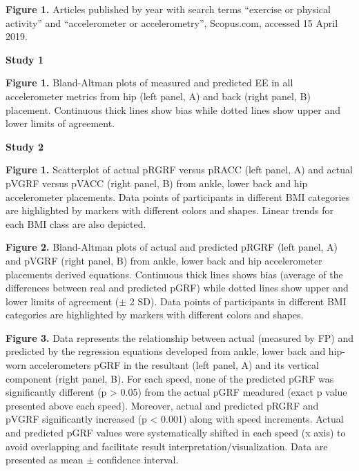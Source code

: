 \documentclass[12pt]{article}
\begin{document}
\vspace{0.5em}

\noindent \textbf{Figure 1.} Articles published by year with search terms ``exercise or physical activity'' and ``accelerometer or accelerometry'', Scopus.com, accessed 15 April 2019. 
\vspace{2em}

\noindent \textbf{Study 1}
\vspace{0.5em}

\noindent \textbf{Figure 1.} Bland-Altman plots of measured and predicted EE in all accelerometer metrics from hip (left panel, A) and back (right panel, B) placement. Continuous thick lines show bias while dotted lines show upper and lower limits of agreement.

\noindent {}
\vspace{2em}

\noindent \textbf{Study 2}
\vspace{0.5em}

\noindent \textbf{Figure 1.} Scatterplot of actual pRGRF versus pRACC (left panel, A) and actual pVGRF versus pVACC (right panel, B) from ankle, lower back and hip accelerometer placements. Data points of participants in different BMI categories are highlighted by markers with different colors and shapes. Linear trends for each BMI class are also depicted. 
\vspace{0.3em}

\noindent \textbf{Figure 2.} Bland-Altman plots of actual and predicted pRGRF (left panel, A) and pVGRF (right panel, B) from ankle, lower back and hip accelerometer placements derived equations. Continuous thick lines shows bias (average of the differences between real and predicted pGRF) while dotted lines show upper and lower limits of agreement ($\pm$ 2 SD). Data points of participants in different BMI categories are highlighted by markers with different colors and shapes. 
\vspace{0.3em}

\noindent \textbf{Figure 3.} Data represents the relationship between actual (measured by FP) and predicted by the regression equations developed from ankle, lower back and hip-worn accelerometers pGRF in the resultant (left panel, A) and its vertical component (right panel, B). For each speed, none of the predicted pGRF was significantly different (p > 0.05) from the actual pGRF meadured (exact p value presented above each speed). Moreover, actual and predicted pRGRF and pVGRF significantly increased (p < 0.001) along with speed increments. Actual and predicted pGRF values were systematically shifted in each speed (x axis) to avoid overlapping and facilitate result interpretation/visualization. Data are presented as mean $\pm$ confidence interval. 
\vspace{0.3em}
\end{document}

